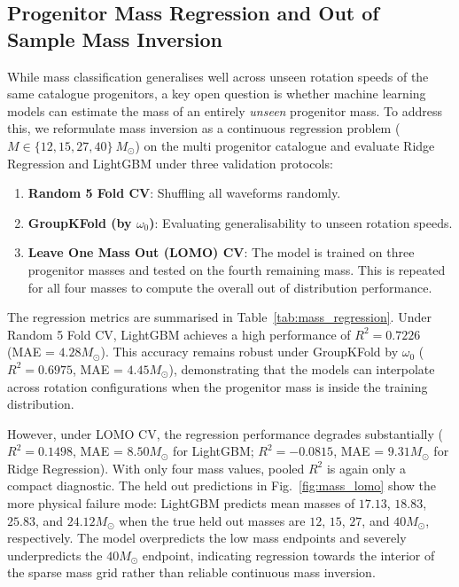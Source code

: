 \documentclass[reprint,aps,prd,floatfix,nofootinbib,superscriptaddress,showpacs]{revtex4-2}
\begin{document}
\subsection{Progenitor Mass Regression and Out of Sample Mass Inversion}
While mass classification generalises well across unseen rotation speeds of the same catalogue progenitors, a key open question is whether machine learning models can estimate the mass of an entirely \textit{unseen} progenitor mass. To address this, we reformulate mass inversion as a continuous regression problem ($M \in \{12, 15, 27, 40\}\ M_\odot$) on the multi progenitor catalogue and evaluate Ridge Regression and LightGBM under three validation protocols:
\begin{enumerate}
    \item \textbf{Random 5 Fold CV}: Shuffling all waveforms randomly.
    \item \textbf{GroupKFold (by $\omega_0$)}: Evaluating generalisability to unseen rotation speeds.
    \item \textbf{Leave One Mass Out (LOMO) CV}: The model is trained on three progenitor masses and tested on the fourth remaining mass. This is repeated for all four masses to compute the overall out of distribution performance.
\end{enumerate}

The regression metrics are summarised in Table~\ref{tab:mass_regression}. Under Random 5 Fold CV, LightGBM achieves a high performance of $R^2 = 0.7226$ (MAE = $4.28 M_\odot$). This accuracy remains robust under GroupKFold by $\omega_0$ ($R^2 = 0.6975$, MAE = $4.45 M_\odot$), demonstrating that the models can interpolate across rotation configurations when the progenitor mass is inside the training distribution. 

However, under LOMO CV, the regression performance degrades substantially ($R^2 = 0.1498$, MAE = $8.50 M_\odot$ for LightGBM; $R^2 = -0.0815$, MAE = $9.31 M_\odot$ for Ridge Regression). With only four mass values, pooled $R^2$ is again only a compact diagnostic. The held out predictions in Fig.~\ref{fig:mass_lomo} show the more physical failure mode: LightGBM predicts mean masses of $17.13$, $18.83$, $25.83$, and $24.12 M_\odot$ when the true held out masses are $12$, $15$, $27$, and $40 M_\odot$, respectively. The model overpredicts the low mass endpoints and severely underpredicts the $40 M_\odot$ endpoint, indicating regression towards the interior of the sparse mass grid rather than reliable continuous mass inversion.
\end{document}
